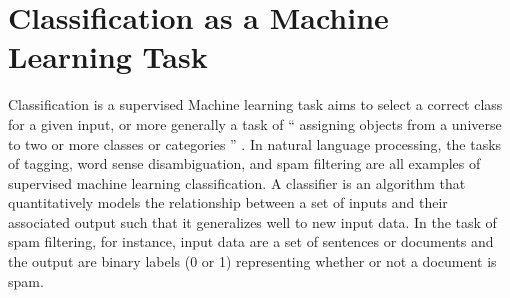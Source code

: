 %
%

\section{Classification as a Machine Learning Task}
Classification is a supervised Machine learning task aims to select a correct class for a given input, or more generally a task of “ assigning objects from a universe to two or more classes or categories ” \citep{manning1999foundations}. In natural language processing, the tasks of tagging, word sense disambiguation, and spam filtering are all examples of supervised machine learning classification. A classifier is an algorithm that quantitatively models the relationship between a set of inputs and their associated output such that it generalizes well to new input data. In the task of spam filtering, for instance, input data are a set of sentences or documents and the output are binary labels (0 or 1) representing whether or not a document is spam. 


